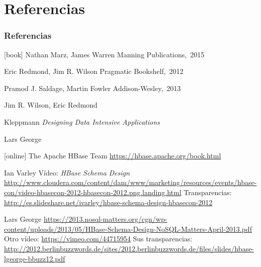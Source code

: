 \documentclass[14pt]{beamer}
\begin{document}
\section{Referencias}

\begin{frame}
  \frametitle{Referencias}

\begin{thebibliography}{Paternostro, 2009}

[book]
Nathan Marz, James Warren
\newblock Manning Publications,~2015

Eric Redmond, Jim R. Wilson
\newblock Pragmatic  Bookshelf,~2012

Pramod J. Saldage, Martin Fowler
\newblock Addison-Wesley,~2013

Jim R. Wilson, Eric Redmond

Kleppmann
\newblock  \emph{Designing Data Intensive Applications}

Lars George

[online]
  The Apache HBase Team
  \newblock \url{https://hbase.apache.org/book.html}

  Ian Varley
\newblock Vídeo: {\em HBase Schema Design}
\newblock
\url{http://www.cloudera.com/content/dam/www/marketing/resources/events/hbase-con/video-hbasecon-2012-hbasecon-2012.png.landing.html}
\newblock Transparencias:
\url{http://es.slideshare.net/ivarley/hbase-schema-design-hbasecon-2012}

  Lars George
\newblock \url{https://2013.nosql-matters.org/cgn/wp-content/uploads/2013/05/HBase-Schema-Design-NoSQL-Matters-April-2013.pdf}
\newblock Otro vídeo: \url{https://vimeo.com/44715954}
\newblock Sus transparencias: \url{http://2012.berlinbuzzwords.de/sites/2012.berlinbuzzwords.de/files/slides/hbase-lgeorge-bbuzz12.pdf}


\end{thebibliography}
\end{frame}
\end{document}
